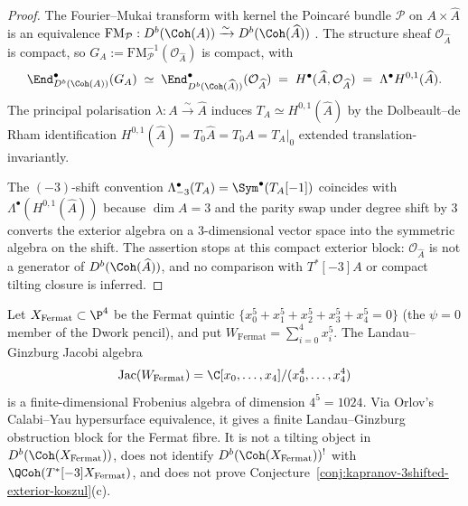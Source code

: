 \begin{proof}
The Fourier--Mukai transform with kernel the Poincar\'e bundle
$\mathcal{P}$ on $A \times \widehat{A}$ is an equivalence
$\mathrm{FM}_{\mathcal{P}} : D^b(\Coh(A)) \xrightarrow{\sim}
D^b(\Coh(\widehat{A}))$ \cite{Mukai1981}. The structure sheaf
$\mathcal{O}_{\widehat{A}}$ is compact, so
$G_A := \mathrm{FM}_{\mathcal{P}}^{-1}(\mathcal{O}_{\widehat{A}})$ is
compact, with
\[
\End^\bullet_{D^b(\Coh(A))}(G_A)
\;\simeq\; \End^\bullet_{D^b(\Coh(\widehat{A}))}(\mathcal{O}_{\widehat{A}})
\;=\; H^\bullet(\widehat{A}, \mathcal{O}_{\widehat{A}})
\;=\; \Lambda^\bullet H^{0,1}(\widehat{A}).
\]
The principal polarisation $\lambda: A \xrightarrow{\sim} \widehat{A}$
induces $T_A \simeq H^{0,1}(\widehat{A})$ by the Dolbeault--de Rham
identification $H^{0,1}(\widehat{A}) = T_0 \widehat{A} =
T_0 A = T_A|_0$ extended translation-invariantly.

The $(-3)$-shift convention $\Lambda^\bullet_{-3}(T_A) =
\Sym^\bullet(T_A[-1])$ coincides with $\Lambda^\bullet(H^{0,1}(\widehat{A}))$
because $\dim A = 3$ and the parity swap under degree shift by $3$
converts the exterior algebra on a $3$-dimensional vector space into
the symmetric algebra on the shift. The assertion stops at this compact
exterior block: $\mathcal{O}_{\widehat A}$ is not a generator of
$D^b(\Coh(\widehat A))$, and no comparison with $T^*[-3]A$ or compact
tilting closure is inferred.
\end{proof}

\begin{proposition}
\label{prop:cy-b-d3-fermat-quintic}
Let $X_{\mathrm{Fermat}} \subset \P^4$ be the Fermat quintic
$\{x_0^5 + x_1^5 + x_2^5 + x_3^5 + x_4^5 = 0\}$ (the
$\psi = 0$ member of the Dwork pencil), and put
$W_{\mathrm{Fermat}} = \sum_{i=0}^4 x_i^5$. The Landau--Ginzburg
Jacobi algebra
\[
 \mathrm{Jac}(W_{\mathrm{Fermat}})
 = \C[x_0,\dots,x_4]/(x_0^4,\dots,x_4^4)
\]
is a finite-dimensional Frobenius algebra of dimension $4^5=1024$.
Via Orlov's Calabi--Yau hypersurface equivalence, it gives a finite
Landau--Ginzburg obstruction block for the Fermat fibre. It is not a
tilting object in $D^b(\Coh(X_{\mathrm{Fermat}}))$, does not identify
$D^b(\Coh(X_{\mathrm{Fermat}}))^!$ with $\QCoh(T^*[-3]X_{\mathrm{Fermat}})$,
and does not prove Conjecture~\ref{conj:kapranov-3shifted-exterior-koszul}(c).
\end{proposition}

